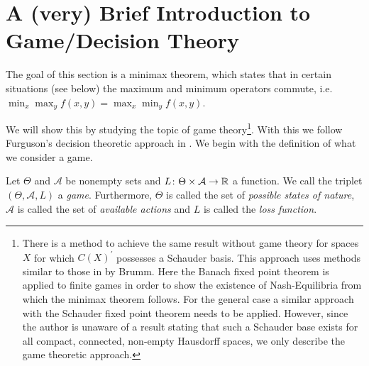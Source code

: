 \section{A (very) Brief Introduction to Game/Decision Theory}
The goal of this section is a minimax theorem, which states that in certain situations (see below) the maximum and minimum \glqq operators\grqq{} commute, i.e. $\min_x\max_y f(x,y)=\max_x\min_y f(x,y)$.

We will show this by studying the topic of game theory\footnote{There is a method to achieve the same result without game theory for spaces $X$ for which $C(X)^\prime$ possesses a Schauder basis. This approach uses methods similar to those in \cite{nash2} by Brumm. Here the Banach fixed point theorem is applied to finite games in order to show the existence of Nash-Equilibria from which the minimax theorem follows. For the general case a similar approach with the Schauder fixed point theorem needs to be applied. However, since the author is unaware of a result stating that such a Schauder base exists for all compact, connected, non-empty Hausdorff spaces, we only describe the game theoretic approach.}. With this we follow Furguson's decision theoretic approach in \cite{ferguson:decistion-theory}. 
We begin with the definition of what we consider a game.

\begin{definition}
	Let $\Theta$ and $\mathcal{A}$ be nonempty sets and $L\colon\Theta\times \mathcal{A}\to \mathbb{R}$ a function. We call the triplet $(\Theta,\mathcal{A},L)$ a \emph{game}. Furthermore, $\Theta$ is called the set of \emph{possible states of nature}, $\mathcal{A}$ is called the set of \emph{available actions} and $L$ is called the \emph{loss function}.
\end{definition}

